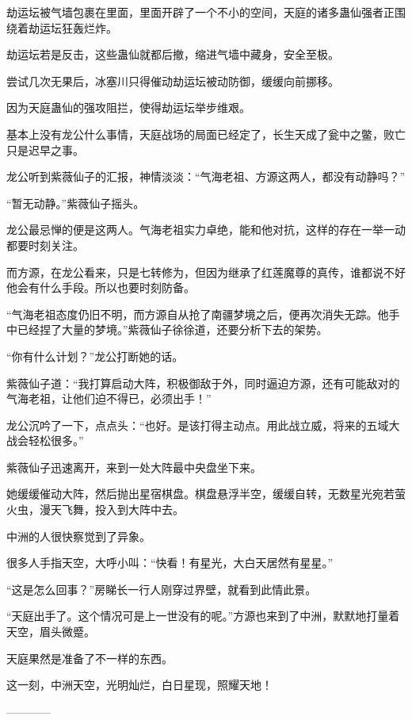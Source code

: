 \begin{this_body}
劫运坛被气墙包裹在里面，里面开辟了一个不小的空间，天庭的诸多蛊仙强者正围绕着劫运坛狂轰烂炸。

劫运坛若是反击，这些蛊仙就都后撤，缩进气墙中藏身，安全至极。

尝试几次无果后，冰塞川只得催动劫运坛被动防御，缓缓向前挪移。

因为天庭蛊仙的强攻阻拦，使得劫运坛举步维艰。

基本上没有龙公什么事情，天庭战场的局面已经定了，长生天成了瓮中之鳖，败亡只是迟早之事。

龙公听到紫薇仙子的汇报，神情淡淡：“气海老祖、方源这两人，都没有动静吗？”

“暂无动静。”紫薇仙子摇头。

龙公最忌惮的便是这两人。气海老祖实力卓绝，能和他对抗，这样的存在一举一动都要时刻关注。

而方源，在龙公看来，只是七转修为，但因为继承了红莲魔尊的真传，谁都说不好他会有什么手段。所以也要时刻防备。

“气海老祖态度仍旧不明，而方源自从抢了南疆梦境之后，便再次消失无踪。他手中已经捏了大量的梦境。”紫薇仙子徐徐道，还要分析下去的架势。

“你有什么计划？”龙公打断她的话。

紫薇仙子道：“我打算启动大阵，积极御敌于外，同时逼迫方源，还有可能敌对的气海老祖，让他们迫不得已，必须出手！”

龙公沉吟了一下，点点头：“也好。是该打得主动点。用此战立威，将来的五域大战会轻松很多。”

紫薇仙子迅速离开，来到一处大阵最中央盘坐下来。

她缓缓催动大阵，然后抛出星宿棋盘。棋盘悬浮半空，缓缓自转，无数星光宛若萤火虫，漫天飞舞，投入到大阵中去。

中洲的人很快察觉到了异象。

很多人手指天空，大呼小叫：“快看！有星光，大白天居然有星星。”

“这是怎么回事？”房睇长一行人刚穿过界壁，就看到此情此景。

“天庭出手了。这个情况可是上一世没有的呢。”方源也来到了中洲，默默地打量着天空，眉头微蹙。

天庭果然是准备了不一样的东西。

这一刻，中洲天空，光明灿烂，白日星现，照耀天地！

------------

\end{this_body}

